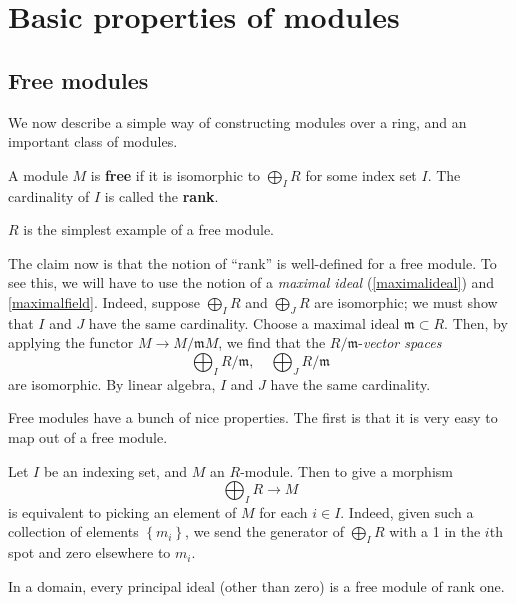 \section{Basic properties of modules}

\subsection{Free modules}

We now describe a simple way of constructing modules over a ring, and an
important class of modules.

\begin{definition} 
A module $M$ is \textbf{free} if it is isomorphic to $\bigoplus_I R$ for some
index set $I$. The cardinality of $I$ is called the \textbf{rank}.
\end{definition} 

\begin{example} 
$R$ is the simplest example of a free module.
\end{example} 

The claim now is that the notion of ``rank'' is well-defined for a free
module. To see this, we will have to use the notion 
of a \emph{maximal ideal} (\cref{maximalideal}) and
\cref{maximalfield}.
Indeed, suppose
$\bigoplus_I R$ and $\bigoplus_J R$ are isomorphic; we must show that $I$ and
$J$ have the same cardinality. Choose a maximal ideal $\mathfrak{m}
\subset R$. Then, by applying the functor $M \to
M/\mathfrak{m}M$, we find that the $R/\mathfrak{m}$-\emph{vector spaces}
\[ \bigoplus_I R/\mathfrak{m}, \quad \bigoplus_J R/\mathfrak{m}  \]
are isomorphic. By linear algebra, $I$ and $J$ have the same cardinality. 


Free modules have a bunch of nice properties. The first is that it is very
easy to map out of a free module.
\begin{example} 
Let $I$ be an indexing set, and $M$ an $R$-module. Then to give a morphism
\[ \bigoplus_I R \to M  \]
is equivalent to picking an element of $M$ for each $i \in I$. Indeed, given
such a collection of elements $\left\{m_i\right\}$, we send the generator of $\bigoplus_I R$ with a 1
in the $i$th spot and zero elsewhere to $m_i$.
\end{example}

\begin{example} 
In a domain, every principal ideal (other than zero) is a free module of rank
one.
\end{example} 

